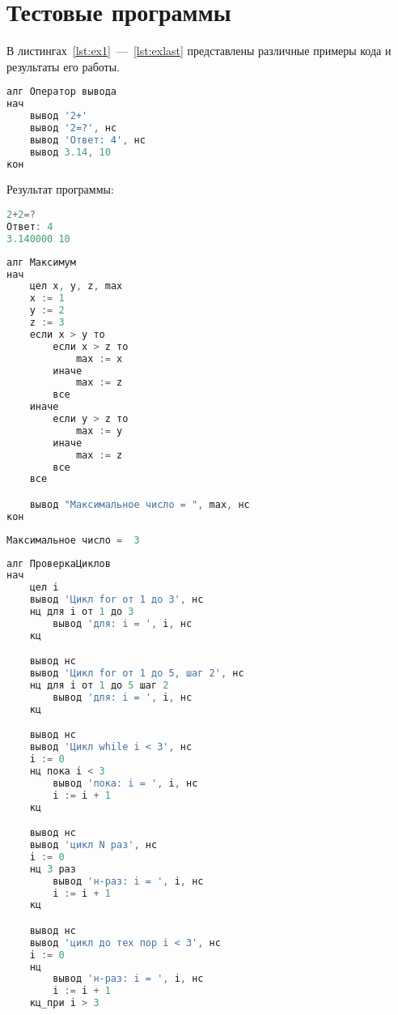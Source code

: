 \section{Тестовые программы}
\label{appendix:b}

В листингах~\ref{lst:ex1}~---~\ref{lst:exlast} представлены различные примеры кода и результаты его работы.

\begin{lstlisting}[language=go, caption={Пример программы с различными выводами}, label=lst:ex1]
алг Оператор вывода
нач
    вывод '2+'
    вывод '2=?', нс
    вывод 'Ответ: 4', нс
    вывод 3.14, 10
кон
\end{lstlisting}

Результат программы:
\begin{lstlisting}[language=go, caption={Результат программы с различными выводами}]
2+2=? 
Ответ: 4 
3.140000 10
\end{lstlisting}

\begin{lstlisting}[language=go, caption={Пример программы условиями}]
алг Максимум
нач
    цел x, y, z, max
    x := 1
    y := 2
    z := 3
    если x > y то
        если x > z то
            max := x
        иначе
            max := z
        все
    иначе
        если y > z то
            max := y
        иначе
            max := z
        все
    все

    вывод "Максимальное число = ", max, нс
кон
\end{lstlisting}

\begin{lstlisting}[language=go, caption={Результат программы условиями}]
Максимальное число =  3 
\end{lstlisting}

\begin{lstlisting}[language=go, caption={Пример программы с различными видами циклов}]
алг ПроверкаЦиклов
нач
    цел i
    вывод 'Цикл for от 1 до 3', нс
    нц для i от 1 до 3
        вывод 'для: i = ', i, нс
    кц

    вывод нс
    вывод 'Цикл for от 1 до 5, шаг 2', нс
    нц для i от 1 до 5 шаг 2
        вывод 'для: i = ', i, нс
    кц

    вывод нс
    вывод 'Цикл while i < 3', нс
    i := 0
    нц пока i < 3
        вывод 'пока: i = ', i, нс
        i := i + 1
    кц

    вывод нс
    вывод 'цикл N раз', нс
    i := 0
    нц 3 раз
        вывод 'н-раз: i = ', i, нс
        i := i + 1
    кц

    вывод нс
    вывод 'цикл до тех пор i < 3', нс
    i := 0
    нц
        вывод 'н-раз: i = ', i, нс
        i := i + 1
    кц_при i > 3
\end{lstlisting}

